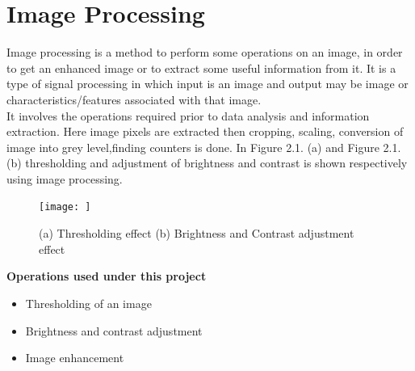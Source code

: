 \section{Image Processing}
\noindent Image processing is a method to perform some operations on an image, in order to get an enhanced image or to extract some useful information from it. It is a type of signal processing in which input is an image and output may be image or characteristics/features associated with that image.\\It involves the operations required prior to data analysis and information extraction. Here image pixels are extracted then cropping, scaling, conversion of image into grey level,finding counters is done. In Figure 2.1. (a) and Figure 2.1. (b)  thresholding and adjustment of brightness and contrast is shown respectively using image processing.\citeauthor{9020106}\\
\begin{figure}[h!]
	\centering
	\texttt{[image: ]}
	\caption{(a) Thresholding effect (b) Brightness and Contrast adjustment effect}
\end{figure}
\textbf{Operations used under this project}
\begin{itemize}
    \item Thresholding of an image
    \item Brightness and contrast adjustment
    \item Image enhancement
\end{itemize}
\newpage
